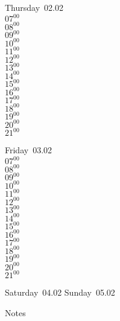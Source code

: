 \documentclass[11pt,a4paper]{book}\usepackage[]{graphicx}\usepackage[]{color}
\begin{document}
\clearpage
\begin{headerbox}
\end{headerbox}
\begin{weekdaybox}
  Thursday~02.02\\
  { 
  \vfill
  $07^{00}$\\
$08^{00}$\\
$09^{00}$\\
$10^{00}$\\
$11^{00}$\\
$12^{00}$\\
$13^{00}$\\
$14^{00}$\\
$15^{00}$\\
$16^{00}$\\
$17^{00}$\\
$18^{00}$\\
$19^{00}$\\
$20^{00}$\\
$21^{00}$\\
  }
\end{weekdaybox} 
\begin{weekdaybox}
  Friday~03.02\\
  { 
  \vfill
  $07^{00}$\\
$08^{00}$\\
$09^{00}$\\
$10^{00}$\\
$11^{00}$\\
$12^{00}$\\
$13^{00}$\\
$14^{00}$\\
$15^{00}$\\
$16^{00}$\\
$17^{00}$\\
$18^{00}$\\
$19^{00}$\\
$20^{00}$\\
$21^{00}$\\
  }
\end{weekdaybox}
\begin{weekendbox}
  Saturday~04.02
  \tcblower
  Sunday~05.02
\end{weekendbox} %
\begin{notebox}
  Notes
\end{notebox}
\clearpage
\end{document}
